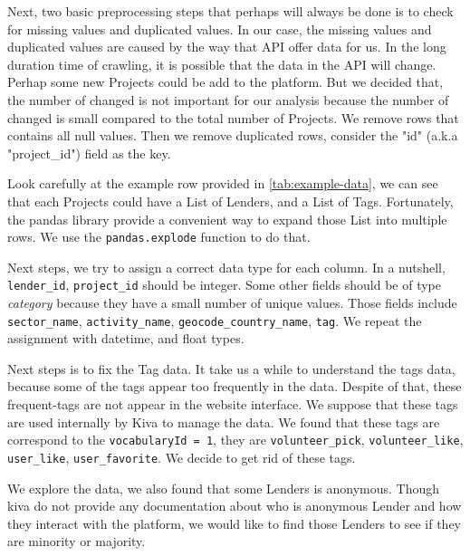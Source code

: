 Next, two basic preprocessing steps that perhaps will always be done is to check for missing values and duplicated values.
In our case, the missing values and duplicated values are caused by the way that API offer data for us.
In the long duration time of crawling, it is possible that the data in the API will change.
Perhap some new Projects could be add to the platform.
But we decided that, the number of changed is not important for our analysis because the number of changed is small compared to the total number of Projects.
We remove rows that contains all null values.
Then we remove duplicated rows, consider the "id" (a.k.a "project\_id") field as the key.

Look carefully at the example row provided in \ref{tab:example-data},
we can see that each Projects could have a List of Lenders, and a List of Tags.
Fortunately, the pandas library provide a convenient way to expand those List into multiple rows.
We use the \lstinline|pandas.explode| function to do that.

Next steps, we try to assign a correct data type for each column.
In a nutshell, \lstinline|lender_id|, \lstinline|project_id| should be integer.
Some other fields should be of type \textit{category} because they have a small number of unique values.
Those fields include \lstinline|sector_name|, \lstinline|activity_name|, \lstinline|geocode_country_name|, \lstinline|tag|.
We repeat the assignment with datetime, and float types.

Next steps is to fix the Tag data.
It take us a while to understand the tags data, because some of the tags appear too frequently in the data.
Despite of that, these frequent-tags are not appear in the website interface.
We suppose that these tags are used internally by Kiva to manage the data.
We found that these tags are correspond to the \lstinline|vocabularyId = 1|,
they are \lstinline|volunteer_pick|, \lstinline|volunteer_like|, \lstinline|user_like|, \lstinline|user_favorite|.
We decide to get rid of these tags.


We explore the data, we also found that some Lenders is anonymous.
Though kiva do not provide any documentation about who is anonymous Lender and how they interact with the platform,
we would like to find those Lenders to see if they are minority or majority.


